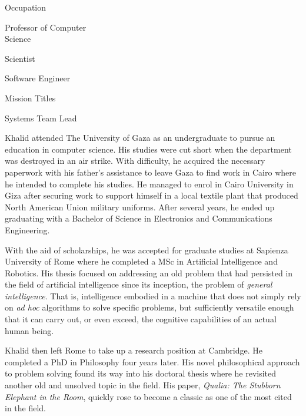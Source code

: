 {        \bTR
            \bTC Occupation \eTC
            \bTC 
                \startitemize[4]
                \startpacked
                \item Professor of Computer\\Science
                \item Scientist
                \item Software Engineer
                \stoppacked
                \stopitemize
            \eTC
        \eTR
        
        \bTR
            \bTC Mission Titles \eTC
            \bTC 
                \startitemize[4]
                \startpacked
                \item Systems Team Lead
                \stoppacked
                \stopitemize
            \eTC
        \eTR
    \eTABLEbody

\eTABLE
}

Khalid attended The University of Gaza as an undergraduate to pursue an education in computer science. His studies were cut short when the department was destroyed in an air strike. With difficulty, he acquired the necessary paperwork with his father's assistance to leave Gaza to find work in Cairo where he intended to complete his studies. He managed to enrol in Cairo University in Giza after securing work to support himself in a local textile plant that produced North American Union military uniforms. After several years, he ended up graduating with a Bachelor of Science in Electronics and Communications Engineering. 

With the aid of scholarships, he was accepted for graduate studies at Sapienza University of Rome where he completed a MSc in Artificial Intelligence and Robotics. His thesis focused on addressing an old problem that had persisted in the field of artificial intelligence since its inception, the problem of {\it general intelligence}. That is, intelligence embodied in a machine that does not simply rely on {\it ad hoc} algorithms to solve specific problems, but sufficiently versatile enough that it can carry out, or even exceed, the cognitive capabilities of an actual human being.

Khalid then left Rome to take up a research position at Cambridge. He completed a PhD in Philosophy four years later. His novel philosophical approach to problem solving found its way into his doctoral thesis where he revisited another old and unsolved topic in the field. His paper, {\it Qualia: The Stubborn Elephant in the Room}, quickly rose to become a classic as one of the most cited in the field.

